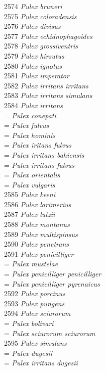 \documentclass[
]{article}
\begin{document}
2574 \emph{Pulex bruneri}\\
2575 \emph{Pulex coloradensis}\\
2576 \emph{Pulex divisus}\\
2577 \emph{Pulex echidnophagoides}\\
2578 \emph{Pulex grossiventris}\\
2579 \emph{Pulex hirsutus}\\
2580 \emph{Pulex ignotus}\\
2581 \emph{Pulex imperator}\\
2582 \emph{Pulex irritans irritans}\\
2583 \emph{Pulex irritans simulans}\\
2584 \emph{Pulex irritans}\\
= \emph{Pulex conepati}\\
= \emph{Pulex fulvus}\\
= \emph{Pulex hominis}\\
= \emph{Pulex iritans fulvus}\\
= \emph{Pulex irritans bahiensis}\\
= \emph{Pulex irritans fulvus}\\
= \emph{Pulex orientalis}\\
= \emph{Pulex vulgaris}\\
2585 \emph{Pulex keeni}\\
2586 \emph{Pulex larimerius}\\
2587 \emph{Pulex lutzii}\\
2588 \emph{Pulex montanus}\\
2589 \emph{Pulex multispinsus}\\
2590 \emph{Pulex penetrans}\\
2591 \emph{Pulex penicilliger}\\
= \emph{Pulex mustelae}\\
= \emph{Pulex penicilliger penicilliger}\\
= \emph{Pulex penicilliger pyrenaicus}\\
2592 \emph{Pulex porcinus}\\
2593 \emph{Pulex pungens}\\
2594 \emph{Pulex sciurorum}\\
= \emph{Pulex bolivari}\\
= \emph{Pulex sciurorum sciurorum}\\
2595 \emph{Pulex simulans}\\
= \emph{Pulex dugesii}\\
= \emph{Pulex irritans dugesii}\\
\end{document}
